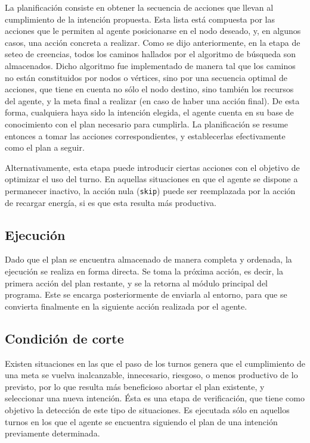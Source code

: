 \documentclass[oneside]{book}
\begin{document}

La planificación consiste en obtener la secuencia de acciones que llevan al cumplimiento 
de la intención propuesta. Esta lista está compuesta por las acciones que le permiten al 
agente posicionarse en el nodo deseado, y, en algunos casos, una acción concreta a realizar. 
Como se dijo anteriormente, en la etapa de seteo de creencias, todos los caminos hallados 
por el algoritmo de búsqueda son almacenados. Dicho algoritmo fue implementado de manera 
tal que los caminos no están constituidos por nodos o vértices, sino por una secuencia 
optimal de acciones, que tiene en cuenta no sólo el nodo destino, sino también los recursos 
del agente, y la meta final a realizar (en caso de haber una acción final). De esta forma, 
cualquiera haya sido la intención elegida, el agente cuenta en su base de conocimiento 
con el plan necesario para cumplirla. La planificación se resume entonces a tomar las 
acciones correspondientes, y establecerlas efectivamente como el plan a seguir.

Alternativamente, esta etapa puede introducir ciertas acciones con el objetivo de optimizar 
el uso del turno. En aquellas situaciones en que el agente se dispone a permanecer inactivo, 
la acción nula (\texttt{skip}) puede ser reemplazada por la acción de recargar energía, si es que 
esta resulta más productiva.

\subsection{Ejecución}

\label{sec:ejecucion}

Dado que el plan se encuentra almacenado de manera completa y ordenada, la ejecución se 
realiza en forma directa. Se toma la próxima acción, es decir, la primera acción del plan 
restante, y se la retorna al módulo principal del programa. Este se encarga posteriormente 
de enviarla al entorno, para que se convierta finalmente en la siguiente acción realizada 
por el agente.

\subsection{Condición de corte}

\label{sec:condicionDeCorte}

Existen situaciones en las que el paso de los turnos genera que el cumplimiento de una 
meta se vuelva inalcanzable, innecesario, riesgoso, o menos productivo de lo previsto, por 
lo que resulta más beneficioso abortar el plan existente, y seleccionar una nueva intención. 
Ésta es una etapa de verificación, que tiene como objetivo la detección de este tipo de 
situaciones. Es ejecutada sólo en aquellos turnos en los que el agente se encuentra 
siguiendo el plan de una intención previamente determinada.
\end{document}

